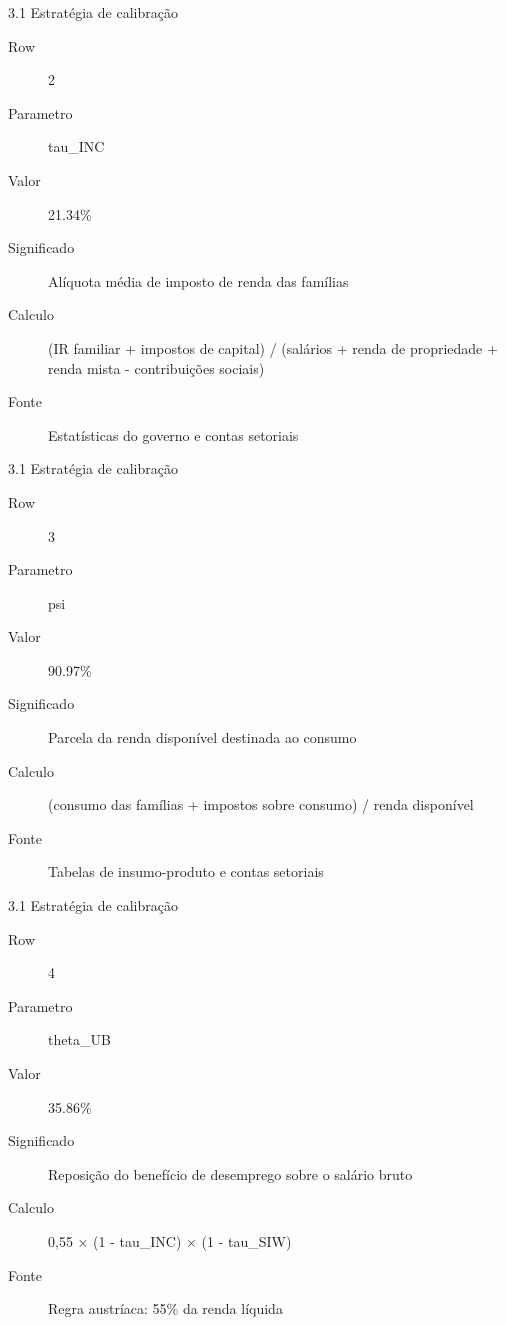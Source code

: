 \documentclass[aspectratio=169,11pt]{beamer}
\begin{document}
\begin{frame}[allowframebreaks]{3.1 Estratégia de calibração}
\small
\begin{description}
\item[Row] 2
\item[Parametro] tau\_INC
\item[Valor] 21.34\%
\item[Significado] Alíquota média de imposto de renda das famílias
\item[Calculo] (IR familiar + impostos de capital) / (salários + renda de propriedade + renda mista - contribuições sociais)
\item[Fonte] Estatísticas do governo e contas setoriais
\end{description}
\end{frame}


\begin{frame}[allowframebreaks]{3.1 Estratégia de calibração}
\small
\begin{description}
\item[Row] 3
\item[Parametro] psi
\item[Valor] 90.97\%
\item[Significado] Parcela da renda disponível destinada ao consumo
\item[Calculo] (consumo das famílias + impostos sobre consumo) / renda disponível
\item[Fonte] Tabelas de insumo-produto e contas setoriais
\end{description}
\end{frame}


\begin{frame}[allowframebreaks]{3.1 Estratégia de calibração}
\small
\begin{description}
\item[Row] 4
\item[Parametro] theta\_UB
\item[Valor] 35.86\%
\item[Significado] Reposição do benefício de desemprego sobre o salário bruto
\item[Calculo] 0,55 × (1 - tau\_INC) × (1 - tau\_SIW)
\item[Fonte] Regra austríaca: 55\% da renda líquida
\end{description}
\end{frame}
\end{document}
